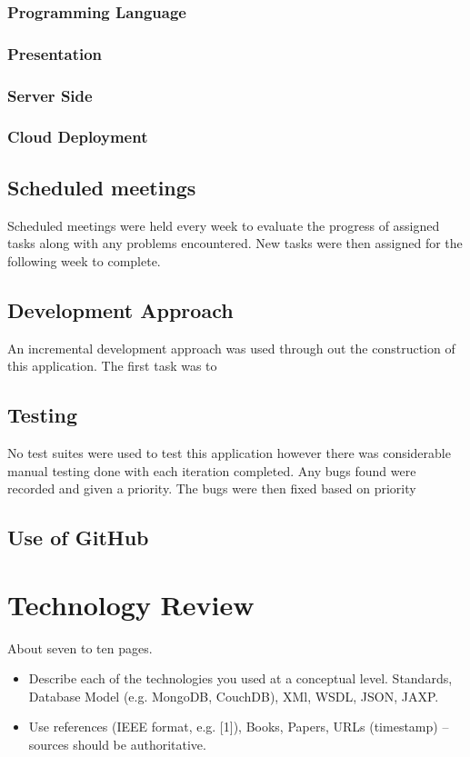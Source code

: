 \subsection{Programming Language}

\subsection{Presentation}

\subsection{Server Side}

\subsection{Cloud Deployment}




\section {Scheduled meetings}
Scheduled meetings were held every week to evaluate the progress of assigned tasks along with any problems encountered.
New tasks were then assigned for the following week to complete.

\section{Development Approach}
An incremental development approach was used through out the construction of this application. The first task was to 
\section{Testing}
No test suites were used to test this application however there was considerable manual testing done with each iteration completed. Any bugs found were recorded and given a priority. The bugs were then fixed based on priority 
\section{Use of GitHub}





\chapter{Technology Review}
About seven to ten pages.
\begin{itemize}
\item Describe each of the technologies you used at a conceptual level. Standards, Database Model (e.g. MongoDB, CouchDB), XMl, WSDL, JSON, JAXP.
\item Use references (IEEE format, e.g. [1]), Books, Papers, URLs (timestamp) – sources should be authoritative. 
\end{itemize}


